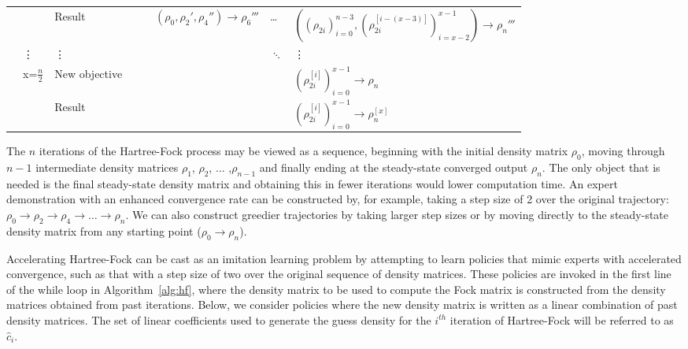 \documentclass[twoside,11pt]{article}
\begin{document}
\begin{center}
\begin{table}[t]
{\begin{tabular}{|l|l|l|l|l|l|l|l|}
	&                 & Result &                 &                 & $(\rho_0,\rho_2',\rho_4'')  \rightarrow \rho_6'''$ &  \ldots & $((\rho_{2i})_{i=0}^{n-3} ,(\rho_{2i}^{[i-(x-3)]})_{i=x-2}^{x-1})\rightarrow \rho_{n}'''$      \\ \cline{2-8} 
	& \vdots      & \vdots      &                &                &                & $\ddots$ &   \vdots \\ \cline{2-8} 
	& \multirow{2}{*}{ x=$\frac{n}{2}$} & New objective         &                         &                          &                            &  & $(\rho_{2i}^{[i]})_{i=0}^{x-1} \rightarrow \rho_{n}$     \\ \cline{3-8} 
	&                & Result  &                &                &                &  & $(\rho_{2i}^{[i]})_{i=0}^{x-1}\rightarrow \rho_{n}^{[x]}$ \\ \hline
	\end{tabular}}
	\label{tab:DAgger}
	\end{table}
\end{center} 

The $n$ iterations of the Hartree-Fock process may be viewed as a sequence, beginning with the initial density matrix $\rho_0$, moving through $n-1$ intermediate density matrices $\rho_1$,  $\rho_2$,  $\ldots$ ,$\rho_{n-1}$ and finally ending at the steady-state converged output $\rho_{n}$. The only object that is needed is the final steady-state density matrix and obtaining this in fewer iterations would lower computation time. An expert demonstration with an enhanced convergence rate can be constructed by, for example, taking a step size of 2 over the original trajectory: $\rho_0 \rightarrow \rho_2 \rightarrow  \rho_4 \rightarrow  \ldots \rightarrow  \rho_{n}$. We can also construct greedier trajectories by taking larger step sizes or by moving directly to the steady-state density matrix from any starting point ($\rho_0 \rightarrow \rho_{n}$). 

Accelerating Hartree-Fock can be cast as an imitation learning problem by attempting to learn policies that mimic experts with accelerated convergence, such as that with a step size of two over the original sequence of density matrices. These policies are invoked in the first line of the while loop in Algorithm~\ref{alg:hf}, where the density matrix to be used to compute the Fock matrix is constructed from the density matrices obtained from past iterations. Below, we consider policies where the new density matrix is written as a linear combination of past density matrices. The set of linear coefficients used to generate the guess density for the $i^{th}$ iteration of Hartree-Fock will be referred to as $\hat{c}_i$.
\end{document}
